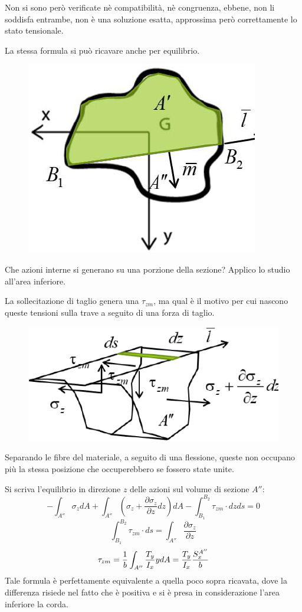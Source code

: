		 Non si sono però verificate nè compatibilità, nè congruenza, ebbene, non li soddisfa entrambe, non è una soluzione esatta, approssima però correttamente lo stato tensionale. \newline 
		 
		 La stessa formula si può ricavare anche per equilibrio. 
		 
\begin{figure}[H]
	\centering
	\includegraphics[width=0.3\linewidth]{immagini_6/screenshot004}
	\label{fig:screenshot004.2}
\end{figure}

		Che azioni interne si generano su una porzione della sezione? Applico lo studio all'area inferiore.

		La sollecitazione di taglio genera una $\tau_{zm}$, ma qual è il motivo per cui nascono queste tensioni sulla trave a seguito di una forza di taglio.
		
\begin{figure}[H]
	\centering
	\label{fig:screenshot005}
	\includegraphics[width=0.5\linewidth]{immagini_6/screenshot005}
\end{figure}


		Separando le fibre del materiale, a seguito di una flessione, queste non occupano più la stessa posizione che occuperebbero se fossero state unite.
		
		Si scriva  l'equilibrio in direzione $z$ delle azioni sul volume di sezione $A''$:
		\[ -\int_{A''}\sigma_zdA + \int_{A''}\left(\sigma_z + \dfrac{\partial\sigma_z}{\partial z}dz\right)dA - \int_{B_1}^{B_2} \tau_{zm} \cdot dz ds = 0 \]
		\[ \int_{B_1}^{B_2} \tau_{zm} \cdot ds = \int_{A''}\dfrac{\partial\sigma_z}{\partial z} \]
		\[ \tau_{zm} = {1\over b} \int_{A''}\dfrac{T_y}{I_x}ydA = \dfrac{T_y}{I_x}\dfrac{S_x^{A''}}{b}\]
		Tale formula è perfettamente equivalente a quella poco sopra ricavata, dove la differenza risiede nel fatto che è positiva e si è presa in considerazione l'area inferiore la corda. \newline 
		
